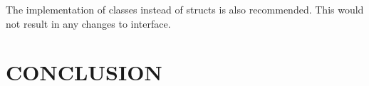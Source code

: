\documentclass[10pt,twocolumn]{witseiepaper}
\begin{document}
The implementation of classes instead of structs is also recommended. This would not result in any changes to interface.

%
\section{CONCLUSION}


\balance

%


\end{document}

